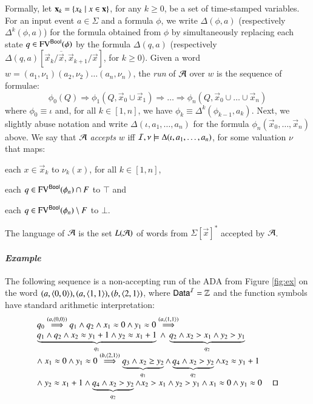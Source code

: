 \documentclass[10pt]{llncs}
\begin{document}
Formally, let $\mathbf x_k = \left\{ x_k \mid x \in \mathbf x \right\}$, for any
$k\geq0$, be a set of time-stamped variables. For an input event $a
\in \Sigma$ and a formula $\phi$, we write $\Delta(\phi,a)$
(respectively $\Delta^k(\phi,a)$) for the formula obtained from $\phi$
by simultaneously replacing each state $q \in \mathrm{FV}^{\mathsf{Bool}}(\phi)$ by the
formula $\Delta(q,a)$ (respectively
$\Delta(q,a)[\vec{x}_k/\overline{\vec{x}},\vec{x}_{k+1}/\vec{x}]$, for
$k\geq0$). Given a word $w = (a_1,\nu_1)(a_2,\nu_2) \ldots
(a_n,\nu_n)$, the \emph{run} of $\mathcal{A}$ over $w$ is the sequence of
formulae: \[\phi_0(Q) \Rightarrow \phi_1(Q,\vec{x}_0 \cup \vec{x}_1)
\Rightarrow \ldots \Rightarrow \phi_n(Q,\vec{x}_0 \cup \ldots \cup
\vec{x}_n)\] where $\phi_0 \equiv \iota$ and, for all $k\in[1,n]$, we
have $\phi_k \equiv \Delta^k(\phi_{k-1},a_k)$. Next, we slightly abuse
notation and write $\Delta(\iota,a_1,\ldots,a_n)$ for the formula
$\phi_n(\vec{x}_0,\ldots,\vec{x}_n)$ above. We say that $\mathcal{A}$
\emph{accepts} $w$ iff $\mathcal{I},\nu \models \Delta(\iota,a_1,\ldots,a_n)$,
for some valuation $\nu$ that maps:\begin{inparaenum}[(1)]
%
\item each $x \in \vec{x}_k$ to $\nu_k(x)$, for all $k\in[1,n]$, 
%
\item each $q \in \mathrm{FV}^{\mathsf{Bool}}(\phi_n) \cap F$ to $\top$ and 
%
\item each $q \in \mathrm{FV}^{\mathsf{Bool}}(\phi_n) \setminus F$ to $\bot$.
\end{inparaenum}
The language of $\mathcal{A}$ is the set $L(\mathcal{A})$ of words from
$\Sigma[\vec{x}]^*$ accepted by $\mathcal{A}$.

\paragraph{\em Example} 
The following sequence is a non-accepting run of the ADA from Figure
\ref{fig:ex} on the word
$(a,\left\langle 0,0 \right\rangle),(a,\left\langle 1,1 \right\rangle),(b,\left\langle 2,1 \right\rangle)$, where $\mathsf{Data}^{\mathcal{I}} =
{\bf \mathbb{Z}}$ and the function symbols have standard arithmetic
interpretation:
\[\begin{array}{l}
q_0 \stackrel{(a,\tuple{0,0})}{\Longrightarrow} 
q_1 \wedge q_2 \wedge x_1\teq0 \wedge y_1\teq0 \stackrel{(a,\tuple{1,1})}{\Longrightarrow} \\ 
\underbrace{q_1 \wedge q_2 \wedge x_2\teq y_1+1 \wedge y_2\teq x_1+1}_{q_1} ~\wedge~
\underbrace{q_2 \wedge x_2>x_1 \wedge y_2>y_1}_{q_2} \\ 
\wedge~ x_1\teq0 \wedge y_1\teq0 \stackrel{(b,\tuple{2,1})}{\Longrightarrow} 
\underbrace{q_3 \wedge x_2\geq y_2}_{q_1} \wedge \underbrace{q_4 \wedge x_2>y_2}_{q_2} \wedge x_2\teq y_1+1 \\ 
\wedge~ y_2\teq x_1+1 \wedge \underbrace{q_4 \wedge x_2>y_2}_{q_2} \wedge x_2>x_1 \wedge y_2>y_1 \wedge x_1\teq0 \wedge y_1\teq0 ~\hfill\text{\qed}
\end{array}\]
\end{document}

